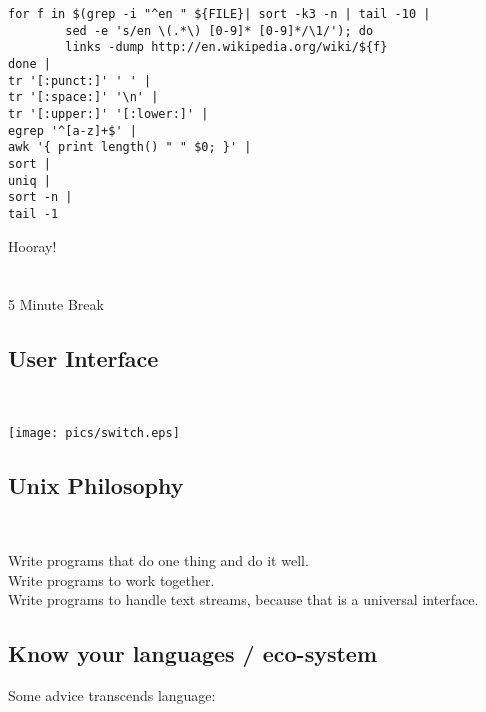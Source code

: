 \documentclass[xga]{xdvislides}
\begin{document}
\begin{verbatim}
for f in $(grep -i "^en " ${FILE}| sort -k3 -n | tail -10 |
        sed -e 's/en \(.*\) [0-9]* [0-9]*/\1/'); do
        links -dump http://en.wikipedia.org/wiki/${f}
done |
tr '[:punct:]' ' ' |
tr '[:space:]' '\n' |
tr '[:upper:]' '[:lower:]' |
egrep '^[a-z]+$' |
awk '{ print length() " " $0; }' |
sort |
uniq |
sort -n |
tail -1
\end{verbatim}

\newpage
\vspace*{\fill}
\begin{center}
    \Hugesize
        Hooray! \\ [1em]
    \hspace*{5mm}
    \blueline\\
    \hspace*{5mm}\\
        5 Minute Break
\end{center}
\vspace*{\fill}

\subsection{User Interface}
\\
\vspace*{\fill}
\begin{center}
	\texttt{[image: pics/switch.eps]}
\end{center}
\vspace*{\fill}


\subsection{Unix Philosophy}
\\
\Huge
\begin{center}
	Write programs that do one thing and do it well.\\
	\vspace{.5in}
	Write programs to work together. \\
	\vspace{.5in}
	Write programs to handle text streams, because that is a universal interface.
\end{center}
\Normalsize

\subsection{Know your languages / eco-system}
Some advice transcends language: \\
\end{document}
